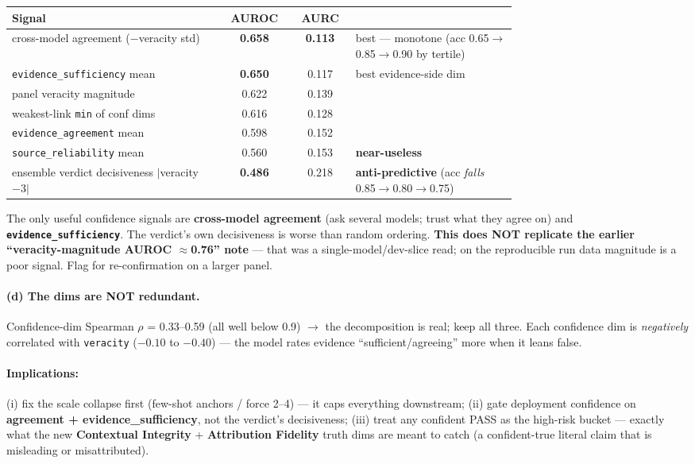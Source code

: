 \documentclass[11pt]{article}
\begin{document}
\begin{longtable}{@{}>{\raggedright\arraybackslash}p{0.42\linewidth}cc
  >{\raggedright\arraybackslash}p{0.32\linewidth}@{}}
\toprule
\textbf{Signal} & \textbf{AUROC} & \textbf{AURC} & \\
\midrule
cross-model agreement ($-$veracity std) & \textbf{0.658} & \textbf{0.113} & best --- monotone
(acc 0.65$\rightarrow$0.85$\rightarrow$0.90 by tertile) \\
\texttt{evidence\_sufficiency} mean & \textbf{0.650} & 0.117 & best evidence-side dim \\
panel veracity magnitude & 0.622 & 0.139 & \\
weakest-link \texttt{min} of conf dims & 0.616 & 0.128 & \\
\texttt{evidence\_agreement} mean & 0.598 & 0.152 & \\
\texttt{source\_reliability} mean & 0.560 & 0.153 & \textbf{near-useless} \\
ensemble verdict decisiveness $|$veracity$-3|$ & \textbf{0.486} & 0.218 &
\textbf{anti-predictive} (acc \emph{falls} 0.85$\rightarrow$0.80$\rightarrow$0.75) \\
\bottomrule
\end{longtable}

The only useful confidence signals are \textbf{cross-model agreement} (ask several models;
trust what they agree on) and \textbf{\texttt{evidence\_sufficiency}}. The verdict's own
decisiveness is worse than random ordering. \textbf{This does NOT replicate the earlier
``veracity-magnitude AUROC $\approx$0.76'' note} --- that was a single-model/dev-slice read;
on the reproducible run data magnitude is a poor signal. Flag for re-confirmation on a larger
panel.

\paragraph{(d) The dims are NOT redundant.} Confidence-dim Spearman $\rho$ = 0.33--0.59 (all
well below 0.9) $\rightarrow$ the decomposition is real; keep all three. Each confidence dim
is \emph{negatively} correlated with \texttt{veracity} ($-0.10$ to $-0.40$) --- the model
rates evidence ``sufficient/agreeing'' more when it leans false.

\paragraph{Implications:} (i) fix the scale collapse first (few-shot anchors / force 2--4) ---
it caps everything downstream; (ii) gate deployment confidence on \textbf{agreement +
evidence\_sufficiency}, not the verdict's decisiveness; (iii) treat any confident PASS as the
high-risk bucket --- exactly what the new \textbf{Contextual Integrity} + \textbf{Attribution
Fidelity} truth dims are meant to catch (a confident-true literal claim that is misleading or
misattributed).
\end{document}
